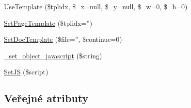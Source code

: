 \begin{DoxyCompactItemize}
\item 
\hyperlink{classm_p_d_f_ae13d2ac975abb5ab1decd287f4f1291c}{Use\-Template} (\$tplidx, \$\-\_\-x=null, \$\-\_\-y=null, \$\-\_\-w=0, \$\-\_\-h=0)
\item 
\hyperlink{classm_p_d_f_a94aabb2aadce5d369b42b758a3c97f12}{Set\-Page\-Template} (\$tplidx='')
\item 
\hyperlink{classm_p_d_f_aa618f0886b400e5a572c338375ba6d7b}{Set\-Doc\-Template} (\$file='', \$continue=0)
\item 
\hyperlink{classm_p_d_f_ab09c49f575c288e53a06427cf8dbb1a8}{\-\_\-set\-\_\-object\-\_\-javascript} (\$string)
\item 
\hyperlink{classm_p_d_f_aa26621b0bfa9344c7c9ec198524aad01}{Set\-J\-S} (\$script)
\end{DoxyCompactItemize}
\subsection*{Veřejné atributy}
